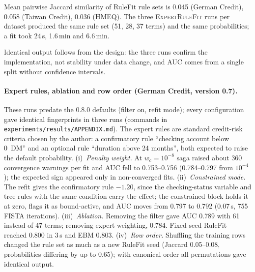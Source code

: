 \documentclass[11pt,a4paper]{article}
\theoremstyle{definition}\newtheorem{definition}{Definition}
\begin{document}
Mean pairwise Jaccard similarity of RuleFit rule sets is 0.045 (German Credit), 0.058 (Taiwan Credit), 0.036 (HMEQ). The three \textsc{ExpertRuleFit} runs per dataset produced the same rule set (51, 28, 37 terms) and the same probabilities; a fit took 24\,s, 1.6\,min and 6.6\,min.

Identical output follows from the design: the three runs confirm the implementation, not stability under data change, and AUC comes from a single split without confidence intervals.

\paragraph{Expert rules, ablation and row order (German Credit, version 0.7).} These runs predate the 0.8.0 defaults (filter on, refit mode); every configuration gave identical fingerprints in three runs (commands in \nolinkurl{experiments/results/APPENDIX.md}). The expert rules are standard credit-risk criteria chosen by the author: a confirmatory rule ``checking account below 0~DM'' and an optional rule ``duration above 24 months'', both expected to raise the default probability. (i)~\emph{Penalty weight.} At $w_c=10^{-8}$ saga raised about 360 convergence warnings per fit and AUC fell to 0.753--0.756 (0.784--0.797 from $10^{-4}$); the expected sign appeared only in non-converged fits. (ii)~\emph{Constrained mode.} The refit gives the confirmatory rule $-1.20$, since the checking-status variable and tree rules with the same condition carry the effect; the constrained block holds it at zero, flags it as bound-active, and AUC moves from 0.797 to 0.792 (0.07\,s, 755 FISTA iterations). (iii)~\emph{Ablation.} Removing the filter gave AUC 0.789 with 61 instead of 47 terms; removing expert weighting, 0.784. Fixed-seed RuleFit reached 0.800 in 3\,s and EBM 0.803. (iv)~\emph{Row order.} Shuffling the training rows changed the rule set as much as a new RuleFit seed (Jaccard 0.05--0.08, probabilities differing by up to 0.65); with canonical order all permutations gave identical output.
\end{document}
